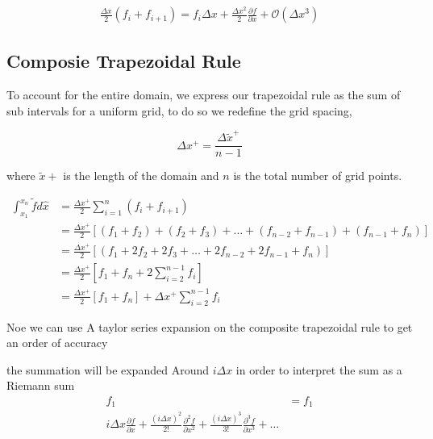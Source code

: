 \begin{align*}
    \frac{\Delta x}{2 }(f_i + f_{i+1} )= 
    f_i {\Delta x} + \frac{\Delta x ^2}{2}\frac{\partial f}{\partial x } +
\mathcal{O}\left( \Delta x^3 \right) 
\end{align*}


\subsection{Composie Trapezoidal Rule}
To account for the entire domain, we express our trapezoidal rule as the sum 
of sub intervals for a uniform grid, to do so we redefine the grid spacing,

\[\Delta x^+   = \frac{\Delta \widetilde{ x}^+  }{n - 1}   \]

where $\widetilde{x}+$ is the length of the domain
and $n$ is the total number of grid points. 

\begin{align*}
    \int_{x_1}^{x_n} \widetilde{f} d \hat{x} &= 
    \frac{\Delta x^+}{2} \sum_{i=1}^{n}
    \left( 
        f_i + f_{i+1}
    \right) \\ 
    &=
    \frac{\Delta x^+}{2}  
    \left[ 
        \left( f_1 + f_2 \right) +
        \left( f_2 + f_3 \right)  +\dots +
        \left( f_{n-2} + f_{n-1} \right) + 
        \left( f_{n-1} + f_{n} \right)  
    \right] \\
    &=
    \frac{\Delta x^+}{2}  
    \left[ 
        \left( f_1 +
            2f_2  +
         2f_3+\dots +
         2f_{n-2} + 
         2f_{n-1}  + 
         f_{n} \right)  
    \right] \\
    &=
    \frac{\Delta x^+}{2}
    \left[ 
        f_1 + f_n + 
        2 \sum_{i=2}^{n-1}
        f_i
    \right] \\
    &=
    \frac{\Delta x^+}{2}
    \left[ 
        f_1 + f_n \right] 
        + 
        \Delta x^+ \sum_{i=2}^{n-1}
    f_i
\end{align*}

Noe we can use A taylor series expansion on the composite trapezoidal rule to
get an order of accuracy

the summation will be expanded Around $ i \Delta x$ in order to interpret the sum 
as a Riemann sum
\begin{align*}
    f_1  &= f_1\\
    i\Delta x \frac{\partial f }{\partial x } +
    \frac{(i\Delta x)^2}{2!} \frac{\partial^2 f }{\partial x^2 } +
    \frac{(i\Delta x)^3}{3!} \frac{\partial^3 f }{\partial x^3 } + \dots
\end{align*}

